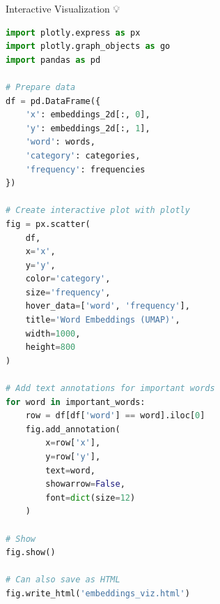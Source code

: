 \documentclass[aspectratio=169]{beamer}
\begin{document}
\begin{frame}[fragile]{Interactive Visualization 💡}
\begin{lstlisting}[language=Python]
import plotly.express as px
import plotly.graph_objects as go
import pandas as pd

# Prepare data
df = pd.DataFrame({
    'x': embeddings_2d[:, 0],
    'y': embeddings_2d[:, 1],
    'word': words,
    'category': categories,
    'frequency': frequencies
})

# Create interactive plot with plotly
fig = px.scatter(
    df,
    x='x',
    y='y',
    color='category',
    size='frequency',
    hover_data=['word', 'frequency'],
    title='Word Embeddings (UMAP)',
    width=1000,
    height=800
)

# Add text annotations for important words
for word in important_words:
    row = df[df['word'] == word].iloc[0]
    fig.add_annotation(
        x=row['x'],
        y=row['y'],
        text=word,
        showarrow=False,
        font=dict(size=12)
    )

# Show
fig.show()

# Can also save as HTML
fig.write_html('embeddings_viz.html')
\end{lstlisting}
\end{frame}
\end{document}
